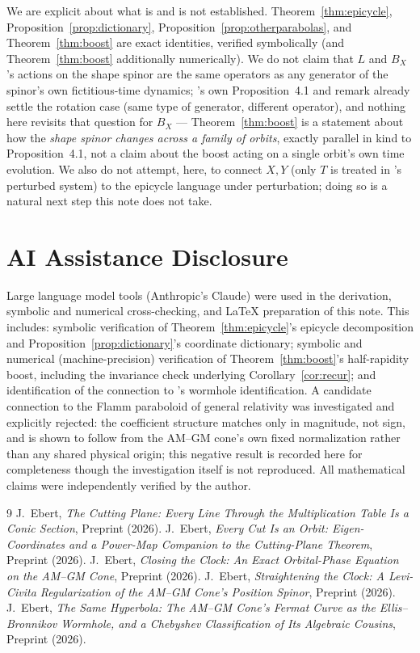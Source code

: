 \documentclass[12pt]{amsart}
\theoremstyle{plain}
\theoremstyle{remark}
\begin{document}
We are explicit about what is and is not established. Theorem~\ref{thm:epicycle}, Proposition~\ref{prop:dictionary}, Proposition~\ref{prop:otherparabolas}, and Theorem~\ref{thm:boost} are exact identities, verified symbolically (and Theorem~\ref{thm:boost} additionally numerically). We do not claim that $L$ and $B_X$'s actions on the shape spinor are the same operators as any generator of the spinor's own fictitious-time dynamics; \cite{Ebert2026LeviCivita}'s own Proposition~4.1 and remark already settle the rotation case (same type of generator, different operator), and nothing here revisits that question for $B_X$ --- Theorem~\ref{thm:boost} is a statement about how the \emph{shape spinor changes across a family of orbits}, exactly parallel in kind to Proposition~4.1, not a claim about the boost acting on a single orbit's own time evolution. We also do not attempt, here, to connect $X,Y$ (only $T$ is treated in \cite{Ebert2026LeviCivita}'s perturbed system) to the epicycle language under perturbation; doing so is a natural next step this note does not take.

\section*{AI Assistance Disclosure}

Large language model tools (Anthropic's Claude) were used in the derivation, symbolic and numerical cross-checking, and \LaTeX{} preparation of this note. This includes: symbolic verification of Theorem~\ref{thm:epicycle}'s epicycle decomposition and Proposition~\ref{prop:dictionary}'s coordinate dictionary; symbolic and numerical (machine-precision) verification of Theorem~\ref{thm:boost}'s half-rapidity boost, including the invariance check underlying Corollary~\ref{cor:recur}; and identification of the connection to \cite{Ebert2026Wormhole}'s wormhole identification. A candidate connection to the Flamm paraboloid of general relativity was investigated and explicitly rejected: the coefficient structure matches only in magnitude, not sign, and is shown to follow from the AM--GM cone's own fixed normalization rather than any shared physical origin; this negative result is recorded here for completeness though the investigation itself is not reproduced. All mathematical claims were independently verified by the author.

\begin{thebibliography}{9}
 J.~Ebert, \emph{The Cutting Plane: Every Line Through the Multiplication Table Is a Conic Section}, Preprint (2026).
 J.~Ebert, \emph{Every Cut Is an Orbit: Eigen-Coordinates and a Power-Map Companion to the Cutting-Plane Theorem}, Preprint (2026).
 J.~Ebert, \emph{Closing the Clock: An Exact Orbital-Phase Equation on the AM--GM Cone}, Preprint (2026).
 J.~Ebert, \emph{Straightening the Clock: A Levi-Civita Regularization of the AM--GM Cone's Position Spinor}, Preprint (2026).
 J.~Ebert, \emph{The Same Hyperbola: The AM--GM Cone's Fermat Curve as the Ellis--Bronnikov Wormhole, and a Chebyshev Classification of Its Algebraic Cousins}, Preprint (2026).
\end{thebibliography}
\end{document}

